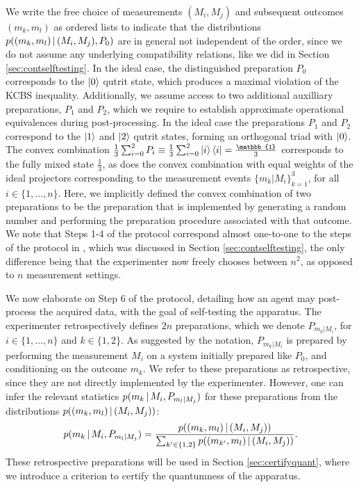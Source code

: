 We write the free choice of measurements $(M_i,M_j)$ and subsequent outcomes $(m_k,m_l)$ as ordered lists to indicate that the distributions $p((m_k,m_l)\thinspace\vert\thinspace (M_i,M_j),P_0)$ are in general not independent of the order, since we do not assume any underlying compatibility relations, like we did in Section \ref{sec:contselftesting}. In the ideal case, the distinguished preparation $P_0$ corresponds to the $\ket{0}$ qutrit state, which produces a maximal violation of the KCBS inequality. Additionally, we assume access to two additional auxilliary preparations, $P_1$ and $P_2$, which we require to establish approximate operational equivalences during post-processing. In the ideal case the preparations $P_1$ and $P_2$ correspond to the $\ket{1}$ and $\ket{2}$ qutrit states, forming an orthogonal triad with $\ket{0}$. The convex combination $\frac{1}{3}\sum_{i=0}^2 P_i\equiv\frac{1}{3}\sum_{i=0}^2\ket{i}\bra{i}=\frac{\mathbb{1}}{3}$ corresponds to the fully mixed state $\frac{\mathbb{1}}{3}$, as does the convex combination with equal weights of the ideal projectors corresponding to the measurement events $\{m_k\vert M_i\}_{k=1}^3$, for all $i\in\{1,\dots,n\}$. Here, we implicitly defined the convex combination of two preparations to be the preparation that is implemented by generating a random number and performing the preparation procedure associated with that outcome. We note that Steps 1-4 of the protocol correspond almost one-to-one to the steps of the protocol in \cite{Bharti2019}, which was discussed in Section \ref{sec:contselftesting}, the only difference being that the experimenter now freely chooses between $n^2$, as opposed to $n$ measurement settings.

We now elaborate on Step 6 of the protocol, detailing how an agent may post-process the acquired data, with the goal of self-testing the apparatus. The experimenter retrospectively defines $2n$ preparations, which we denote $P_{m_k\vert M_i}$, for $i\in\{1,\dots,n\}$ and $k\in\{1,2\}$. As suggested by the notation, $P_{m_k\vert M_i}$ is prepared by performing the measurement $M_i$ on a system initially prepared like $P_0$, and conditioning on the outcome $m_k$. We refer to these preparations as retrospective, since they are not directly implemented by the experimenter. However, one can infer the relevant statistics $p(m_k\thinspace\vert\thinspace M_i, P_{m_l\vert M_j})$ for these preparations from the distributions $p((m_k,m_l)\thinspace\vert\thinspace (M_i,M_j))$:
\begin{equation*}
p(m_k\thinspace\vert\thinspace M_i, P_{m_l\vert M_j})=\frac{p((m_k,m_l)\thinspace\vert\thinspace (M_i,M_j))}{\sum_{k'\in\{1,2\}} p((m_{k'},m_l)\thinspace\vert\thinspace (M_i,M_j))}.
\end{equation*}
These retrospective preparations will be used in Section \ref{sec:certifyquant}, where we introduce a criterion to certify the quantumness of the apparatus.


